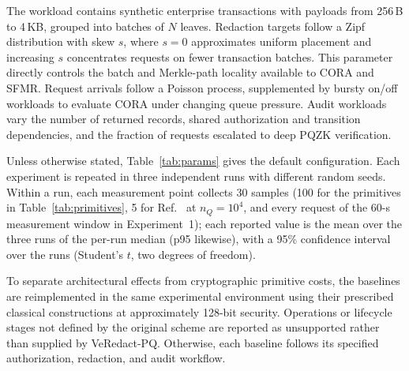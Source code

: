 \documentclass[lettersize,journal]{IEEEtran}
\begin{document}
The workload contains synthetic enterprise transactions with payloads
from 256\,B to 4\,KB, grouped into batches of $N$ leaves. Redaction
targets follow a Zipf distribution with skew $s$, where $s=0$
approximates uniform placement and increasing $s$ concentrates requests
on fewer transaction batches. This parameter directly controls the
batch and Merkle-path locality available to CORA and SFMR. Request
arrivals follow a Poisson process, supplemented by bursty on/off
workloads to evaluate CORA under changing queue pressure. Audit
workloads vary the number of returned records, shared authorization and
transition dependencies, and the fraction of requests escalated to
deep PQZK verification.

Unless otherwise stated, Table~\ref{tab:params} gives the default
configuration. Each experiment is repeated in three independent runs
with different random seeds. Within a run, each measurement point
collects 30 samples (100 for the primitives in Table~\ref{tab:primitives},
5 for Ref.~\cite{ref13} at $n_Q=10^4$, and every request of the 60-s
measurement window in Experiment~1); each reported value is the mean
over the three runs of the per-run median (p95 likewise), with a 95\%
confidence interval over the runs (Student's $t$, two degrees of
freedom).

To separate architectural effects from cryptographic primitive costs,
the baselines are reimplemented in the same experimental environment
using their prescribed classical constructions at approximately
128-bit security. Operations or lifecycle stages not defined by the
original scheme are reported as unsupported rather than supplied by
VeRedact-PQ. Otherwise, each baseline follows its specified
authorization, redaction, and audit workflow.
\end{document}
